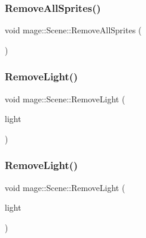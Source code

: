 \subsubsection{\texorpdfstring{Remove\+All\+Sprites()}{RemoveAllSprites()}}
{\footnotesize\ttfamily void mage\+::\+Scene\+::\+Remove\+All\+Sprites (\begin{DoxyParamCaption}{ }\end{DoxyParamCaption})}

\hypertarget{classmage_1_1_scene_a1da46b19f87d387af18d2f7fc37bb6d7}{}\label{classmage_1_1_scene_a1da46b19f87d387af18d2f7fc37bb6d7} 
\subsubsection{\texorpdfstring{Remove\+Light()}{RemoveLight()}\hspace{0.1cm}{\footnotesize\ttfamily [1/2]}}
{\footnotesize\ttfamily void mage\+::\+Scene\+::\+Remove\+Light (\begin{DoxyParamCaption}\item[{\hyperlink{namespacemage_a1e01ae66713838a7a67d30e44c67703e}{Shared\+Ptr}$<$ \hyperlink{namespacemage_a1724c6e6b6b5ba535cdd967cbbb4a669}{Omni\+Light\+Node} $>$}]{light }\end{DoxyParamCaption})\hspace{0.3cm}{\ttfamily [private]}}

\hypertarget{classmage_1_1_scene_a371c31d030990b9fa641271c4c733d87}{}\label{classmage_1_1_scene_a371c31d030990b9fa641271c4c733d87} 
\subsubsection{\texorpdfstring{Remove\+Light()}{RemoveLight()}\hspace{0.1cm}{\footnotesize\ttfamily [2/2]}}
{\footnotesize\ttfamily void mage\+::\+Scene\+::\+Remove\+Light (\begin{DoxyParamCaption}\item[{\hyperlink{namespacemage_a1e01ae66713838a7a67d30e44c67703e}{Shared\+Ptr}$<$ \hyperlink{namespacemage_aeed5dee4ff6c591eabb0e9114256df4a}{Spot\+Light\+Node} $>$}]{light }\end{DoxyParamCaption})\hspace{0.3cm}{\ttfamily [private]}}

